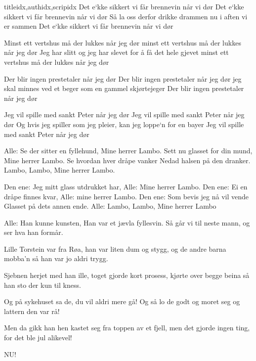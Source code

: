\documentclass[14pt,letterpaper,norsk]{article}
\begin{document}
\begin{songs}{titleidx,authidx,scripidx}
\beginverse
Det e`kke sikkert vi får brennevin når vi dør
Det e`kke sikkert vi får brennevin når vi dør
Så la oss derfor drikke drammen nu i aften vi er sammen
Det e`kke sikkert vi får brennevin når vi dør
\endverse

\beginverse
Minst ett vertshus må der lukkes når jeg dør
minst ett vertshus må der lukkes når jeg dør
Jeg har slitt og jeg har slevet for å få det hele gjevet
minst ett vertshus må der lukkes når jeg dør
\endverse

\beginverse
Der blir ingen prestetaler når jeg dør
Der blir ingen prestetaler når jeg dør
jeg skal minnes ved et beger som en gammel skjørtejeger
Der blir ingen prestetaler når jeg dør
\endverse

\beginverse
Jeg vil spille med sankt Peter når jeg dør
Jeg vil spille med sankt Peter når jeg dør
Og hvis jeg spiller som jeg pleier, kan jeg loppe`n for en bayer
Jeg vil spille med sankt Peter når jeg dør
\endverse
\endsong

\beginverse
Alle: Se der sitter en fyllehund,
Mine herrer Lambo.
Sett nu glasset for din mund,
Mine herrer Lambo.
Se hvordan hver dråpe vanker
Nedad halsen på den dranker.
Lambo, Lambo,
Mine herrer Lambo.
\endverse

\beginverse
Den ene: Jeg mitt glass utdrukket har,
Alle: Mine herrer Lambo.
Den ene: Ei en dråpe finnes kvar,
Alle: mine herrer Lambo.
Den ene: Som bevis jeg nå vil vende
Glasset på dets annen ende.
Alle: Lambo, Lambo,
Mine herrer Lambo
\endverse

\beginverse
Alle: Han kunne kunsten,
Han var et jævla fyllesvin.
Så går vi til neste mann, og
ser hva han formår.
\endverse
\endsong


\beginverse
Lille Torstein var fra Røa,
han var liten dum og stygg,
og de andre barna mobba'n så
han var jo aldri trygg.
\endverse

\beginverse
Sjebnen herjet med han ille,
toget gjorde kort prosess,
kjørte over begge beina
så han sto der kun til kness.
\endverse

\beginverse
Og på sykehuset sa de,
du vil aldri mere gå!
Og så lo de godt og moret seg
og lattern den var rå!
\endverse

\beginverse
Men da gikk han hen kastet seg
fra toppen av et fjell,
men det gjorde ingen ting,
for det ble jul alikevel!
\endverse
\endsong

\beginverse
NU!
\endverse
\endsong


\end{songs}
\end{document}
